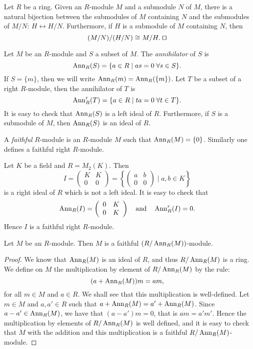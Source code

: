 \begin{theorem} Let $R$ be a ring. Given an $R$-module $M$ and a submodule $N$ of $M$, there is a natural bijection between the submodules of $M$ containing $N$ and the submodules of $M/N$: $H\leftrightarrow H/N$. Furthermore, if $H$ is a submodule of $M$ containing $N$, then
	$$(M/N)/(H/N)\cong M/H.\; \qed$$ 
\end{theorem}



Let $M$ be an $R$-module and $S$ a subset of $M$. The {\em annihilator} of $S$ is
$$\operatorname{Ann}_R(S)=\{ a\in R\mid as=0\;\forall s\in S\} .$$
If $S=\{m\}$, then we will write $\operatorname{Ann}_R(m)=\operatorname{Ann}_R(\{m\})$.
Let $T$ be a subset of a right $R$-module, then the annihilator of $T$ is
$$\operatorname{Ann}^r_R(T)=\{ a\in R\mid ta=0\;\forall t\in T\} .$$
It is easy to check that $\operatorname{Ann}_R(S)$ is a left ideal of $R$. Furthermore,
if $S$ is a submodule of $M$, then $\operatorname{Ann}_R(S)$ is an ideal of $R$.

A {\em faithful} $R$-module is an $R$-module $M$ such that $\operatorname{Ann}_R(M)=\{0\}$. Similarly one defines a faithful right $R$-module.

\begin{example}
Let $K$ be a field and $R=M_2(K)$. Then
$$I=\left(\begin{array}{cc} K&K\\
0&0\end{array}\right) =\left\{\left(\begin{array}{cc} a&b\\
0&0\end{array} \right)\mid a,b\in K\right\} $$
is a right ideal of $R$ which is not a left ideal.
It is easy to check that
$$\operatorname{Ann}_R(I)=\left(\begin{array}{cc} 0&K\\
0&K\end{array}\right)\quad\mbox{and}\quad \operatorname{Ann}^r_R(I)=0.$$
Hence $I$ is a faithful right $R$-module.
\end{example}

\begin{lemma}\label{Lema 1.1.1}
Let $M$ be an $R$-module. Then $M$ is a faithful
$(R/\operatorname{Ann}_R(M))$-module.
\end{lemma}

\begin{proof}
We know that $\operatorname{Ann}_R(M)$ is an ideal of $R$, and thus $R/\operatorname{Ann}_R(M)$ is a ring. 
We define on $M$ the multiplication by element of $R/\operatorname{Ann}_R(M)$ by the rule:
$$(a+\operatorname{Ann}_R(M))m=am,$$
for all $m\in M$ and $a\in R$. We shall see that this multiplication is well-defined.
Let $m\in M$ and $a,a'\in R$ such that $a+\operatorname{Ann}_R(M)=a'+\operatorname{Ann}_R(M)$.
Since $a-a'\in \operatorname{Ann}_R(M)$, we have that
$(a-a')m=0$, that is $am=a'm'$. Hence the multiplication by elements of $R/\operatorname{Ann}_R(M)$ is well defined, 
and it is easy to check that $M$ with the addition and this multiplication is a faithful $R/\operatorname{Ann}_R(M)$-module.
\end{proof}

